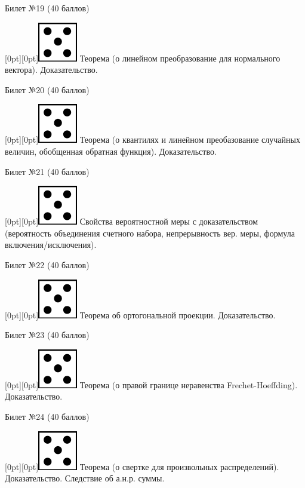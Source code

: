 \documentclass[preview]{standalone}
\begin{document}
\begin{center} {\Large Билет №19 (40 баллов)} \end{center}
\raisebox{-1pt}[0pt][0pt]{\includegraphics[width=0.02\linewidth]{5.png}} Теорема (о линейном преобразование для нормального вектора). Доказательство. \\
\begin{center} {\Large Билет №20 (40 баллов)} \end{center}
\raisebox{-1pt}[0pt][0pt]{\includegraphics[width=0.02\linewidth]{5.png}}   Теорема (о квантилях и линейном преобазование случайных величин, обобщенная обратная функция). Доказательство. \\
\begin{center} {\Large Билет №21 (40 баллов)} \end{center}
\raisebox{-1pt}[0pt][0pt]{\includegraphics[width=0.02\linewidth]{5.png}} Свойства  вероятностной меры с доказательством (вероятность объединения счетного набора, непрерывность вер. меры, формула включения/исключения). \\
\begin{center} {\Large Билет №22 (40 баллов)} \end{center}
\raisebox{-1pt}[0pt][0pt]{\includegraphics[width=0.02\linewidth]{5.png}} Теорема об ортогональной проекции. Доказательство. \\
\begin{center} {\Large Билет №23 (40 баллов)} \end{center}
\raisebox{-1pt}[0pt][0pt]{\includegraphics[width=0.02\linewidth]{5.png}} Теорема (о правой границе неравенства Frechet-Hoeffding).  Доказательство. \\
\begin{center} {\Large Билет №24 (40 баллов)} \end{center}
\raisebox{-1pt}[0pt][0pt]{\includegraphics[width=0.02\linewidth]{5.png}} Теорема (о свертке для произвольных распределений). Доказательство. Следствие об а.н.р. суммы. \\ 
\end{document}
